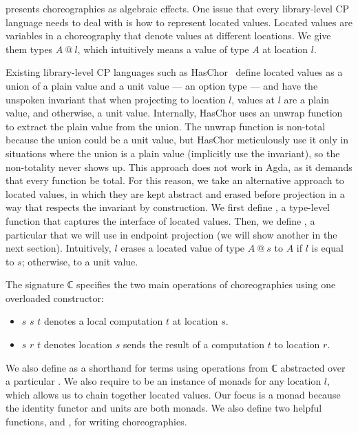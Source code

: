  presents choreographies as algebraic effects.
%
One issue that every library-level CP language needs to deal with is how to represent located values.
%
Located values are variables in a choreography that denote values at different locations.
%
We give them types $A \ @ \ l$, which intuitively means a value of type $A$ at location $l$.

Existing library-level CP languages such as HasChor~\citep{shen-2023} define located values as a union of a plain value and a unit value --- an option type --- and have the unspoken invariant that when projecting to location $l$, values at $l$ are a plain value, and otherwise, a unit value.
%
Internally, HasChor uses an unwrap function to extract the plain value from the union.
%
The unwrap function is non-total because the union could be a unit value, but HasChor meticulously use it only in situations where the union is a plain value (implicitly use the invariant), so the non-totality never shows up.
%
This approach does not work in Agda, as it demands that every function be total.
%
For this reason, we take an alternative approach to located values, in which they are kept abstract and erased before projection in a way that respects the invariant by construction.
%
We first define , a type-level function that captures the interface of located values.
%
Then, we define , a particular  that we will use in endpoint projection (we will show another  in the next section).
%
Intuitively,  $l$ erases a located value of type $A \ @ \ s$ to $A$ if $l$ is equal to $s$; otherwise, to a unit value.

The signature ℂ specifies the two main operations of choreographies using one overloaded constructor:
%
\begin{itemize}
\item
   $s$ $s$ $t$ denotes a local computation $t$ at location $s$.
\item
   $s$ $r$ $t$ denotes location $s$ sends the result of a computation $t$ to location $r$.
\end{itemize}

We also define  as a shorthand for terms using operations from ℂ abstracted over a particular .
%
We also require  to be an instance of monads for any location $l$, which allows us to chain together located values.
%
Our focus is a monad because the identity functor and units are both monads.
%
We also define two helpful functions,  and , for writing choreographies.

